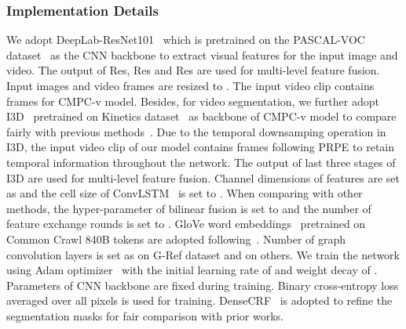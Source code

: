 \documentclass[10pt,journal,cspaper,compsoc]{IEEEtran}
\begin{document}
\subsubsection{Implementation Details}
We adopt DeepLab-ResNet101~\cite{chen2017deeplab} which is pretrained on the PASCAL-VOC dataset~\cite{everingham2010pascal} as the CNN backbone to extract visual features for the input image and video.
The output of Res, Res and Res are used for multi-level feature fusion. Input images and video frames are resized to .
The input video clip contains  frames for CMPC-v model. 
Besides, for video segmentation, we further adopt I3D~\cite{carreira2017quo} pretrained on Kinetics dataset~\cite{kay2017kinetics} as backbone of CMPC-v model to compare fairly with previous methods~\cite{wang2019asymmetric,ning2020polar}. 
Due to the temporal downsamping operation in I3D, the input video clip of our model contains  frames following PRPE to retain temporal information throughout the network. 
The output of last three stages of I3D are used for multi-level feature fusion.
Channel dimensions of features are set as  and the cell size of ConvLSTM~\cite{xingjian2015convolutional} is set to .
When comparing with other methods, the hyper-parameter  of bilinear fusion is set to  and the number of feature exchange rounds  is set to . 
GloVe word embeddings~\cite{pennington2014glove} 
pretrained on Common Crawl 840B tokens are adopted following~\cite{chen2019see}. 
Number of graph convolution layers is set as  on G-Ref dataset and  on others.
We train the network using Adam optimizer~\cite{kingma2014adam} with the initial learning rate of  and weight decay of . 
Parameters of CNN backbone are fixed during training. 
Binary cross-entropy loss averaged over all pixels is used for training. 
DenseCRF~\cite{krahenbuhl2011efficient} is adopted to refine the segmentation masks for fair comparison with prior works.
\end{document}
